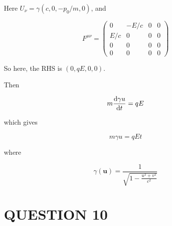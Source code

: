 \documentclass[a4paper]{article}
\begin{document}
Here $ U_{\nu} = \gamma(c,0,-p_{0} /m,0 ) $, and 

\[   F^{\mu\nu} =
\begin{pmatrix}
0 & -E/c & 0 & 0\\
E/c & 0 & 0 & 0\\
0 & 0 & 0 & 0\\
0 & 0 & 0 & 0
\end{pmatrix} \]

So here, the RHS is $ (0,qE,0,0) $.

Then

\[ m \frac{\mathrm{d} \gamma u}{\mathrm{d} t} = q E \]

which gives 

\[ m \gamma u = q E t \]

where 

\[ \gamma(\mathbf{u}) = \frac{1}{\sqrt{ 1 - \frac{u^{2} + v^{2}}{c^{2}}}} \]








\section{QUESTION 10}
\end{document}
